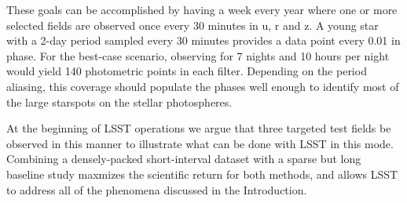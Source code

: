 These goals can be accomplished by having a week every year where
one or more selected fields are observed once every 30 minutes in u, r and z.
A young star with a 2-day period sampled every 30 minutes provides a 
data point every 0.01 in phase. For the best-case scenario, observing for 7 nights
and 10 hours per night would yield 140 photometric points in each filter.
Depending on the period aliasing, this coverage should populate the
phases well enough to identify most of the large starspots on the stellar photospheres.

At the beginning of LSST operations we argue that three targeted test fields
be observed in this manner to illustrate what can be done with LSST in this mode.
Combining a densely-packed short-interval
dataset with a sparse but long baseline study maxmizes the scientific return
for both methods, and allows LSST to address all of the phenomena
discussed in the Introduction.









\navigationbar
